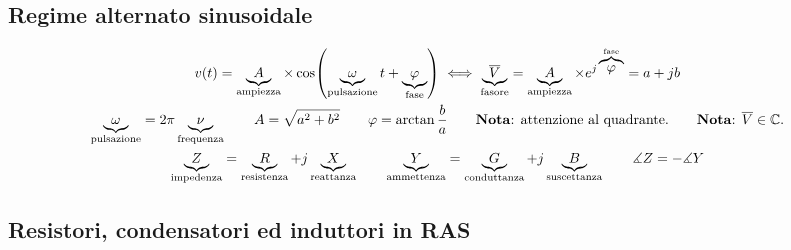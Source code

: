 \documentclass[10pt]{article}
\begin{document}
    \vspace{-\baselineskip}
    \subsection*{Regime alternato sinusoidale}
    \vspace{-1.5\baselineskip}

        \begin{gather*}
            v(t) = \underbrace{A}_{\text{ampiezza}} \times \cos (\underbrace{\omega}_{\text{pulsazione}} t + \underbrace{\varphi}_{\text{fase}}) \iff \underbrace{\overline{V}}_{\text{fasore}} = \underbrace{A}_{\text{ampiezza}} \times e^{j \overbrace{\varphi}^{\text{fase}}} = a + jb\\
            \underbrace{\omega}_{\text{pulsazione}} = 2 \pi \underbrace{\nu}_{\text{frequenza}} \qquad A = \sqrt{a^2 + b^2} \qquad \varphi = \arctan{\frac{b}{a}} \qquad \text{\textbf{Nota}: attenzione al quadrante.} \qquad \text{\textbf{Nota}: } \overline{V} \in \mathbb{C}.\\
            \underbrace{Z}_{\text{impedenza}} = \underbrace{R}_{\text{resistenza}} + j \underbrace{X}_{\text{reattanza}} \qquad \underbrace{Y}_{\text{ammettenza}} = \underbrace{G}_{\text{conduttanza}} + j \underbrace{B}_{\text{suscettanza}} \qquad \measuredangle Z = - \measuredangle Y
        \end{gather*}

    \vspace{-1.5\baselineskip}
    \subsection*{Resistori, condensatori ed induttori in RAS}
    \vspace{-1.5\baselineskip}
\end{document}
